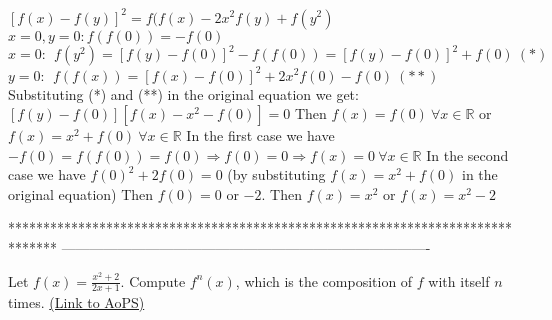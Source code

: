 


\begin{solution}
	$[f(x)-f(y)]^2 = f(f(x)-2x^2f(y)+f(y^2)$
	$x=0,y=0: f(f(0)) = -f(0)$
	$x=0:\ \ f(y^2) = [f(y)-f(0)]^2-f(f(0)) = [f(y)-f(0)]^2 + f(0)\ (*)$
	$y=0:\ \ f(f(x)) = [f(x)-f(0)]^2 + 2x^2f(0) - f(0)\ (**)$ 
	Substituting (*) and (**) in the original equation we get:
	$[f(y)-f(0)][f(x)-x^2-f(0)] = 0$
	Then $f(x) = f(0)\ \forall x\in\mathbb{R}$ or $f(x) = x^2+f(0)\ \forall x\in\mathbb{R}$
	In the first case we have $-f(0) = f(f(0)) = f(0)\Rightarrow f(0) = 0\Rightarrow f(x) = 0\ \forall x\in\mathbb{R}$
	In the second case we have $f(0)^2 + 2f(0) = 0$ (by substituting $f(x) = x^2+f(0)$ in the original equation)
	Then $f(0) = 0$ or $-2$. Then $f(x) = x^2$ or $f(x) = x^2-2$
\end{solution}
*******************************************************************************
-------------------------------------------------------------------------------

\begin{problem}
	Let $f(x)=\frac{x^{2}+2}{2x+1}$. Compute $f^n(x)$, which is the composition of $f$ with itself $n$ times.
	\flushright \href{https://artofproblemsolving.com/community/c6h395886}{(Link to AoPS)}
\end{problem}



